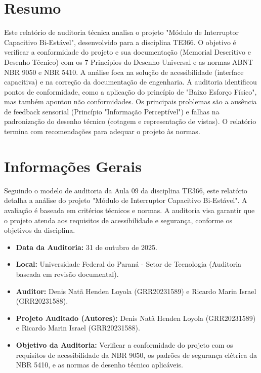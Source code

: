 \documentclass[12pt, openright, a4paper, openany, oneside, chapter=TITLE, section=TITLE, subsection=TITLE, subsubsection=TITLE, subsubsubsection=TITLE, subsubsubsection=TITLE, brazil]{abntex2}
\begin{document}
\pretextual

\imprimircapa
\imprimirfolhaderosto
\clearpage

\chapter*{Resumo}
Este relatório de auditoria técnica analisa o projeto "Módulo de Interruptor Capacitivo Bi-Estável", desenvolvido para a disciplina TE366. O objetivo é verificar a conformidade do projeto e sua documentação (Memorial Descritivo e Desenho Técnico) com os 7 Princípios do Desenho Universal e as normas ABNT NBR 9050 e NBR 5410. A análise foca na solução de acessibilidade (interface capacitiva) e na correção da documentação de engenharia. A auditoria identificou pontos de conformidade, como a aplicação do princípio de "Baixo Esforço Físico", mas também apontou não conformidades. Os principais problemas são a ausência de feedback sensorial (Princípio "Informação Perceptível") e falhas na padronização do desenho técnico (cotagem e representação de vistas). O relatório termina com recomendações para adequar o projeto às normas.

\clearpage
\tableofcontents*
\cleardoublepage

\textual


\chapter{Informações Gerais}
\label{sec:info_gerais}

Seguindo o modelo de auditoria da Aula 09 da disciplina TE366, este relatório detalha a análise do projeto "Módulo de Interruptor Capacitivo Bi-Estável". A avaliação é baseada em critérios técnicos e normas. A auditoria visa garantir que o projeto atenda aos requisitos de acessibilidade e segurança, conforme os objetivos da disciplina.

\begin{itemize}
    \item \textbf{Data da Auditoria:} 31 de outubro de 2025.
    \item \textbf{Local:} Universidade Federal do Paraná - Setor de Tecnologia (Auditoria baseada em revisão documental).
    \item \textbf{Auditor:} Denis Natã Henden Loyola (GRR20231589) e Ricardo Marin Israel (GRR20231588).
    \item \textbf{Projeto Auditado (Autores):} Denis Natã Henden Loyola (GRR20231589) e Ricardo Marin Israel (GRR20231588).
    \item \textbf{Objetivo da Auditoria:} Verificar a conformidade do projeto com os requisitos de acessibilidade da NBR 9050, os padrões de segurança elétrica da NBR 5410, e as normas de desenho técnico aplicáveis.
\end{itemize}
\end{document}
